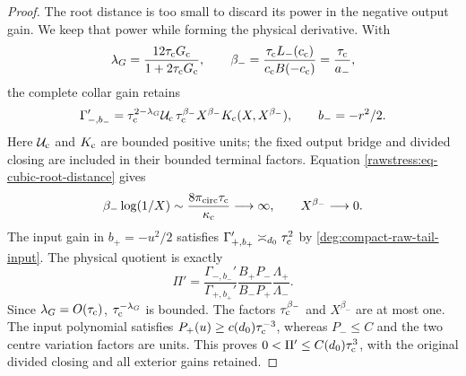 \begin{proof}
The root distance is too small to discard its power in the negative
output gain. We keep that power while forming the physical derivative.
With
\[
 \lambda_G=\frac{12\tau_{\rm c}G_{\rm c}}
                       {1+2\tau_{\rm c}G_{\rm c}},\qquad
 \beta_-=\frac{\tau_{\rm c}L_-(c_{\rm c})}
                    {c_{\rm c}B(-c_{\rm c})}=\frac{\tau_{\rm c}}{a_-},
\]
the complete collar gain retains
\begin{equation}\label{rawstress:eq-cubic-full-gain}
 \Gamma_{-,b_-}'=
 \tau_{\rm c}^{2-\lambda_G}\mathcal U_{\rm c}\,
 \tau_{\rm c}^{\beta_-}X^{\beta_-}
                      K_{\rm c}(X,X^{\beta_-}),\qquad b_-=-r^2/2.
\end{equation}
Here \(\mathcal U_{\rm c}\) and \(K_{\rm c}\) are bounded positive
units; the fixed output bridge and divided closing are included in
their bounded terminal factors. Equation
\eqref{rawstress:eq-cubic-root-distance} gives
\[
 \beta_-\log(1/X)\sim
             \frac{8\pi_{\rm circ}\tau_{\rm c}}{\kappa_{\rm c}}
                   \longrightarrow\infty,
 \qquad X^{\beta_-}\longrightarrow0.
\]
The input gain in \(b_+=-u^2/2\) satisfies
\(\Gamma_{+,b_+}'\asymp_{d_0}\tau_{\rm c}^2\) by
\eqref{deg:compact-raw-tail-input}. The physical quotient is exactly
\begin{equation}\label{rawstress:eq-cubic-physical-ratio}
 \Pi'=\frac{\Gamma_{-,b_-}'}{\Gamma_{+,b_+}'}
       \frac{B_+P_-}{B_-P_+}\frac{\Lambda_+}{\Lambda_-}.
\end{equation}
Since \(\lambda_G=O(\tau_{\rm c})\),
\(\tau_{\rm c}^{-\lambda_G}\) is bounded. The factors
\(\tau_{\rm c}^{\beta_-}\) and \(X^{\beta_-}\) are at most one.
The input polynomial satisfies \(P_+(u)\ge c(d_0)\tau_{\rm c}^{-3}\),
whereas \(P_-\le C\) and the two centre variation factors are units.
This proves
\(0<\Pi'\le C(d_0)\tau_{\rm c}^3\), with the original divided closing
and all exterior gains retained.
\end{proof}
